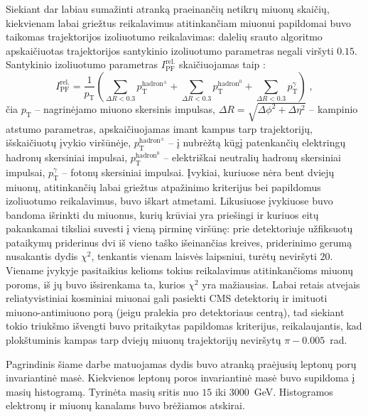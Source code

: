 \documentclass[a4paper, 12pt, oneside]{article}
\newcommand{\pT}{p_{\mathrm{T}}}
\newlength\q
\begin{document}
Siekiant dar labiau sumažinti atranką praeinančių netikrų miuonų skaičių, kiekvienam labai griežtus reikalavimus
atitinkančiam miuonui papildomai buvo taikomas trajektorijos izoliuotumo reikalavimas: dalelių srauto algoritmo
apskaičiuotas trajektorijos santykinio izoliuotumo parametras negali viršyti $0.15$.
Santykinio izoliuotumo parametras $I^{\mathrm{rel.}}_{\mathrm{PF}}$ skaičiuojamas taip \cite{ParticleFlow}:
\begin{equation}
	\label{eq:isolation}
	I^{\mathrm{rel.}}_{\mathrm{PF}} = \frac{1}{p_{\mathrm{T}}} 
	\left( \sum_{\Delta R<0.3} p_{\mathrm{T}}^{\mathrm{hadron^{\pm}}} +
	\sum_{\Delta R<0.3} p_{\mathrm{T}}^{\mathrm{hadron^0}} + 
	\sum_{\Delta R<0.3} p_{\mathrm{T}}^{\gamma} \right) \; \mathrm{,}
\end{equation}
čia $\pT$ -- nagrinėjamo miuono skersinis impulsas, $\Delta R = \sqrt{\Delta \phi^{2} + \Delta \eta^{2}}$ -- kampinio atstumo
parametras, apskaičiuojamas imant kampus tarp trajektorijų, išskaičiuotų įvykio viršūnėje, $p_{\mathrm{T}}^{\mathrm{hadron^{\pm}}}$
-- į nubrėžtą kūgį patenkančių elektringų hadronų skersiniai impulsai, $p_{\mathrm{T}}^{\mathrm{hadron^0}}$ -- elektriškai neutralių
hadronų skersiniai impulsai,  $p_{\mathrm{T}}^{\gamma}$ -- fotonų skersiniai impulsai.
Įvykiai, kuriuose nėra bent dviejų miuonų, atitinkančių labai griežtus atpažinimo kriterijus bei papildomus izoliuotumo
reikalavimus, buvo iškart atmetami.
Likusiuose įvykiuose buvo bandoma išrinkti du miuonus, kurių krūviai yra priešingi ir kuriuos eitų pakankamai tiksliai
suvesti į vieną pirminę viršūnę: prie detektoriuje užfiksuotų pataikymų priderinus dvi iš vieno taško išeinančias kreives,
priderinimo gerumą nusakantis dydis $\chi^2$, tenkantis vienam laisvės laipsniui, turėtų neviršyti $20$.
Viename įvykyje pasitaikius kelioms tokius reikalavimus atitinkančioms miuonų poroms, iš jų buvo išsirenkama ta, kurios
$\chi^2$ yra mažiausias.
Labai retais atvejais reliatyvistiniai kosminiai miuonai gali pasiekti CMS detektorių ir imituoti miuono-antimiuono porą
(jeigu pralekia pro detektoriaus centrą), tad siekiant tokio triukšmo išvengti buvo pritaikytas papildomas kriterijus,
reikalaujantis, kad plokštuminis kampas tarp dviejų miuonų trajektorijų neviršytų $\pi-0.005$~rad.

Pagrindinis šiame darbe matuojamas dydis buvo atranką praėjusių leptonų porų invariantinė masė.
Kiekvienos leptonų poros invariantinė masė buvo supildoma į masių histogramą.
Tyrinėta masių sritis nuo $15$ iki $3000$~GeV.
Histogramos elektronų ir miuonų kanalams buvo brėžiamos atskirai.
\end{document}
